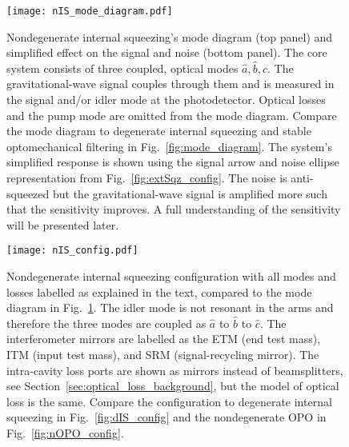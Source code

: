 \begin{figure}
    \centering
    \texttt{[image: nIS\_mode\_diagram.pdf]}
    \caption{  Nondegenerate internal squeezing's mode diagram (top panel) and simplified effect on the signal and noise (bottom panel). The core system consists of three coupled, optical modes $\hat a,\hat b,\hat c$. The gravitational-wave signal couples through them and is measured in the signal and/or idler mode at the photodetector. Optical losses and the pump mode are omitted from the mode diagram. Compare the mode diagram to degenerate internal squeezing and stable optomechanical filtering in Fig.~\ref{fig:mode_diagram}. The system's simplified response is shown using the signal arrow and noise ellipse representation from Fig.~\ref{fig:extSqz_config}. The noise is anti-squeezed but the gravitational-wave signal is amplified more such that the sensitivity improves. A full understanding of the sensitivity will be presented later.}
    \label{fig:nIS_mode_diagram}
\end{figure}
\begin{figure}
	\centering
	\texttt{[image: nIS\_config.pdf]}
	\caption{ Nondegenerate internal squeezing configuration with all modes and losses labelled as explained in the text, compared to the mode diagram in Fig.~\ref{fig:nIS_mode_diagram}. The idler mode is not resonant in the arms and therefore the three modes are coupled as $\hat a$ to $\hat b$ to $\hat c$. The interferometer mirrors are labelled as the ETM (end test mass), ITM (input test mass), and SRM (signal-recycling mirror). The intra-cavity loss ports are shown as mirrors instead of beamsplitters, see Section~\ref{sec:optical_loss_background}, but the model of optical loss is the same. Compare the configuration to degenerate internal squeezing in Fig.~\ref{fig:dIS_config} and the nondegenerate OPO in Fig.~\ref{fig:nOPO_config}.}
	\label{fig:nIS_config}
\end{figure}

